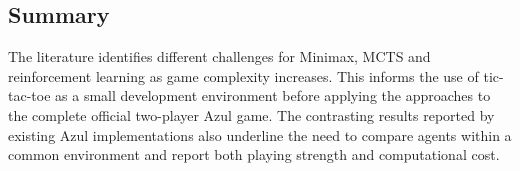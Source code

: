 \subsection{Summary}
The literature identifies different challenges for Minimax, MCTS and reinforcement learning as game complexity increases. This informs the use of tic-tac-toe as a small development environment before applying the approaches to the complete official two-player Azul game. The contrasting results reported by existing Azul implementations also underline the need to compare agents within a common environment and report both playing strength and computational cost.